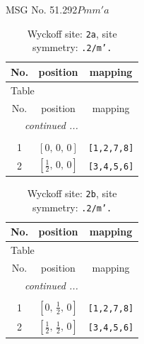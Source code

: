 \documentclass[fleqn,8pt]{jsarticle}
\begin{document}
\setcounter{MaxMatrixCols}{32}

\renewcommand{\tablename}{Table~}
\renewcommand{\figurename}{Figure~}
\begin{center}
\LARGE
MSG No. 51.292\quad$Pmm'a$
\end{center}
\renewcommand{\arraystretch}{1.2}
\begin{longtable}{ccc}
\caption{Wyckoff site: {\tt 2a}, site symmetry: {\tt .2/m'.}}
 \\
 \hline \hline
No. & position & mapping \\ \hline \endfirsthead

\multicolumn{2}{l}{\tablename\ \thetable{}} \\
 \hline \hline
No. & position & mapping \\ \hline \endhead

 \hline \hline
\multicolumn{2}{r}{\footnotesize\it continued ...} \\ \endfoot

 \hline \hline
\multicolumn{2}{r}{} \\ \endlastfoot

1 & $\left[ 0,\, 0,\, 0 \right]$ & {\tt [1,2,7,8]} \\ \hline
2 & $\left[ \frac{1}{2},\, 0,\, 0 \right]$ & {\tt [3,4,5,6]} \\
\end{longtable}
\renewcommand{\arraystretch}{1.2}
\begin{longtable}{ccc}
\caption{Wyckoff site: {\tt 2b}, site symmetry: {\tt .2/m'.}}
 \\
 \hline \hline
No. & position & mapping \\ \hline \endfirsthead

\multicolumn{2}{l}{\tablename\ \thetable{}} \\
 \hline \hline
No. & position & mapping \\ \hline \endhead

 \hline \hline
\multicolumn{2}{r}{\footnotesize\it continued ...} \\ \endfoot

 \hline \hline
\multicolumn{2}{r}{} \\ \endlastfoot

1 & $\left[ 0,\, \frac{1}{2},\, 0 \right]$ & {\tt [1,2,7,8]} \\ \hline
2 & $\left[ \frac{1}{2},\, \frac{1}{2},\, 0 \right]$ & {\tt [3,4,5,6]} \\
\end{longtable}
\renewcommand{\arraystretch}{1.2}
\end{document}
